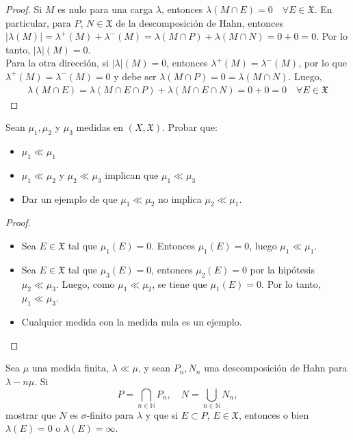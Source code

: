 \documentclass[12pt]{article}
\newenvironment{statement}[2][Ejercicio]{\begin{trivlist}
\item[\hskip \labelsep {\bfseries #1}\hskip \labelsep {\bfseries #2.}]}{\end{trivlist}}
\begin{document}
\begin{proof}
    Si \(M \) es nulo para una carga \(\lambda \), entonces \(\lambda(M \cap E) = 0 \quad \forall E \in \mathfrak{X} \). En particular, para \(P \), \(N \in \mathfrak{X} \) de la descomposición de Hahn,
    entonces \(|\lambda(M)| = \lambda^+(M) + \lambda^-(M) = \lambda(M \cap P) + \lambda(M \cap N) = 0 + 0 = 0 \). Por lo tanto, \(|\lambda|(M) = 0 \). \\
    Para la otra dirección, si \(|\lambda|(M) = 0 \), entonces \(\lambda^+(M) = \lambda^-(M) \), por lo que \(\lambda^+(M) = \lambda^-(M) = 0 \) y debe ser \(\lambda(M \cap P) = 0 = \lambda(M \cap N) \). Luego, \begin{align*}
        \lambda(M \cap E) = \lambda(M \cap E \cap P) + \lambda(M \cap E \cap N) = 0 + 0 = 0 \quad \forall E \in \mathfrak{X}
    \end{align*}
\end{proof}

\begin{statement}{4}
    Sean \(\mu_1, \mu_2 \) y \(\mu_3 \) medidas en \((X, \mathfrak{X}) \). Probar que:
    \begin{itemize}
        \item[(a)] \(\mu_1 \ll \mu_1 \)
        \item[(b)] \(\mu_1 \ll \mu_2 \) y \(\mu_2 \ll \mu_3 \) implican que \(\mu_1 \ll \mu_3 \)
        \item[(c)] Dar un ejemplo de que \(\mu_1 \ll \mu_2 \) no implica \(\mu_2 \ll \mu_1 \).
    \end{itemize}

\end{statement}

\begin{proof}
    \begin{itemize}
        \item[(a)] Sea \(E \in \mathfrak{X} \) tal que \(\mu_1(E) = 0 \). Entonces \(\mu_1(E) = 0 \), luego \(\mu_1 \ll \mu_1 \).
        \item[(b)] Sea \(E \in \mathfrak{X} \) tal que \(\mu_3(E) = 0 \), entonces \(\mu_2(E) = 0 \) por la hipótesis \(\mu_2 \ll \mu_3 \). Luego, como \(\mu_1 \ll \mu_2 \), se tiene que \(\mu_1(E) = 0 \). Por lo tanto, \(\mu_1 \ll \mu_3 \).
        \item[(c)] Cualquier medida con la medida nula es un ejemplo.
    \end{itemize}
\end{proof}

\begin{statement}{5}
    Sea \(\mu \) una medida finita, \(\lambda \ll \mu \), y sean \(P_n, N_n \) una descomposición de Hahn para \(\lambda - n\mu \). Si
    \[
        P = \bigcap_{n \in \mathbb{N}} P_n, \quad N = \bigcup_{n \in \mathbb{N}} N_n,
    \]
    mostrar que \(N \) es \(\sigma \)-finito para \(\lambda \) y que si \(E \subset P \), \(E \in \mathfrak{X} \), entonces o bien \(\lambda(E) = 0 \) o \(\lambda(E) = \infty \).
\end{statement}
\end{document}
